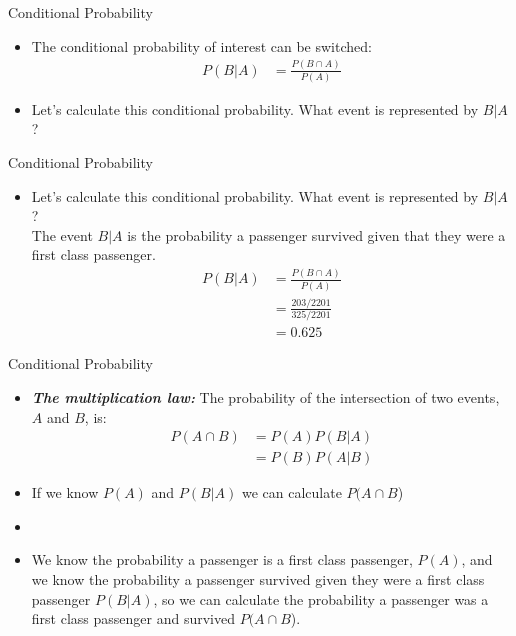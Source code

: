 \documentclass[xcolor=dvipsnames]{beamer}
\begin{document}
\begin{frame}{Conditional Probability}
\begin{itemize}
	\item The conditional probability of interest can be switched: 
	\begin{align*}
	P(B|A) &= \frac{P(B \cap A)}{P(A)}
	\end{align*}
	\item Let's calculate this conditional probability. What event is represented by $B|A$?
\end{itemize}
\end{frame}

\begin{frame}{Conditional Probability}
\begin{itemize}
	\item Let's calculate this conditional probability. What event is represented by $B|A$? \\
	
	The event $B|A$ is the probability a passenger survived given that they were a first class passenger.
	\begin{align*}
	P(B|A) &= \frac{P(B \cap A)}{P(A)} \\
	&= \frac{203 / 2201}{325 / 2201} \\
	&=  0.625
	\end{align*}
\end{itemize}
\end{frame}

\begin{frame}{Conditional Probability}
	\begin{itemize}
		\item \textbf{\emph{The multiplication law:}} The probability of the intersection of two events, $A$ and $B$, is:
		\begin{align*}
		P(A \cap B) &= P(A) P(B|A) \\
		&= P(B)P(A|B)
		\end{align*}
		\item If we know $P(A)$ and $P(B|A)$ we can calculate $P(A \cap B$)
		\item[]
		\item We know the probability a passenger is a first class passenger, $P(A)$, and we know the probability a passenger survived given they were a first class passenger $P(B|A)$, so we can calculate the probability a passenger was a first class passenger and survived $P(A \cap B$).
	\end{itemize}
\end{frame}
\end{document}
